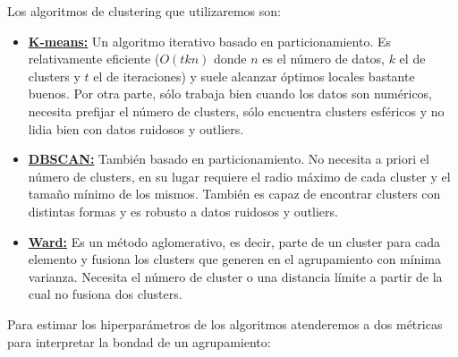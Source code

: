 \documentclass[oneside]{book}
\begin{document}
Los algoritmos de clustering que utilizaremos son:
\begin{itemize}
\item \href{https://en.wikipedia.org/wiki/K-means_clustering}{\textbf{K-means:}} Un algoritmo iterativo basado en
  particionamiento. Es relativamente eficiente ($O(tkn)$ donde $n$ es
  el número de datos, $k$ el de clusters y $t$ el de iteraciones) y
  suele alcanzar óptimos locales bastante buenos. Por otra parte, sólo
  trabaja bien cuando los datos son numéricos, necesita prefijar el
  número de clusters, sólo encuentra clusters esféricos y no lidia
  bien con datos ruidosos y outliers.

\item
  \href{https://en.wikipedia.org/wiki/DBSCAN}{\textbf{DBSCAN:}}
  También basado en particionamiento. No necesita a priori el número
  de clusters, en su lugar requiere el radio máximo de cada cluster y
  el tamaño mínimo de los mismos. También es capaz de encontrar
  clusters con distintas formas y es robusto a datos ruidosos y
  outliers.

\item \href{https://en.wikipedia.org/wiki/Ward%27s_method}
    {\textbf{Ward:}} Es un método aglomerativo, es decir, parte de un
    cluster para cada elemento y fusiona los clusters que generen en
    el agrupamiento con mínima varianza. Necesita el número de cluster
    o una distancia límite a partir de la cual no fusiona dos
    clusters.
\end{itemize}

Para estimar los hiperparámetros de los algoritmos atenderemos a dos
métricas para interpretar la bondad de un agrupamiento:
\end{document}
